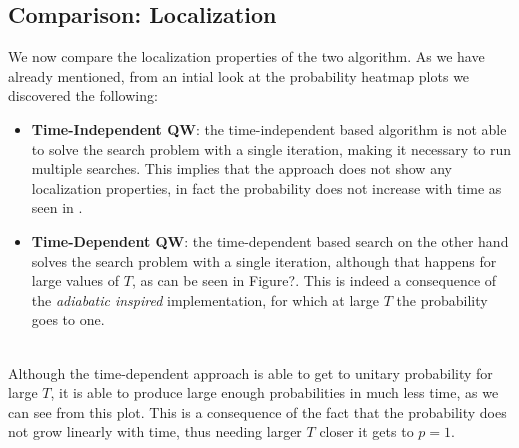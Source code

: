     \subsection{Comparison: Localization}
        We now compare the localization properties of the two algorithm. As we have already mentioned, from an intial look at the probability heatmap plots we discovered the following:
        \begin{itemize}
            \item \textbf{Time-Independent QW}: the time-independent based algorithm is not able to solve the search problem with a single iteration, making it necessary to run multiple searches. This implies that the approach does not show any localization properties, in fact the probability does not increase with time as seen in .
            \item \textbf{Time-Dependent QW}: the time-dependent based search on the other hand solves the search problem with a single iteration, although that happens for large values of $T$, as can be seen in Figure?. This is indeed a consequence of the \textit{adiabatic inspired} implementation, for which at large $T$ the probability goes to one.
        \end{itemize}
        \\
        Although the time-dependent approach is able to get to unitary probability for large $T$, it is able to produce large enough probabilities in much less time, as we can see from this plot. This is a consequence of the fact that the probability does not grow linearly with time, thus needing larger $T$ closer it gets to $p=1$. \\


